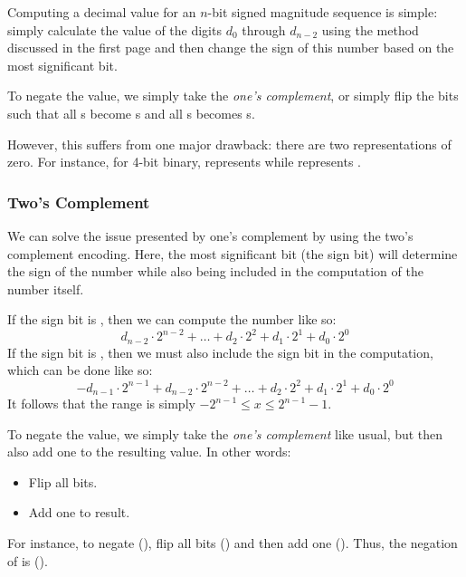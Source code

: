 \documentclass[letterpaper]{article}
\begin{document}
\bigskip 

Computing a decimal value for an $n$-bit signed magnitude sequence is simple: simply calculate the value of the digits $d_0$ through $d_{n - 2}$ using the method discussed in the first page and then change the sign of this number based on the most significant bit. 

\bigskip 

To negate the value, we simply take the \emph{one's complement}, or simply flip the bits such that all s become s and all s becomes s. 

\bigskip 

However, this suffers from one major drawback: there are two representations of zero. For instance, for 4-bit binary,  represents  while  represents . 

\subsubsection{Two's Complement}
We can solve the issue presented by one's complement by using the two's complement encoding. Here, the most significant bit (the sign bit) will determine the sign of the number while also being included in the computation of the number itself. 

\bigskip 

If the sign bit is , then we can compute the number like so:
\[d_{n - 2} \cdot 2^{n - 2} + \dots + d_2 \cdot 2^2 + d_1 \cdot 2^1 + d_0 \cdot 2^0\]
If the sign bit is , then we must also include the sign bit in the computation, which can be done like so:
\[- d_{n - 1} \cdot 2^{n - 1} + d_{n - 2} \cdot 2^{n - 2} + \dots + d_2 \cdot 2^2 + d_1 \cdot 2^1 + d_0 \cdot 2^0\]
It follows that the range is simply $-2^{n - 1} \leq x \leq 2^{n - 1} - 1$. 

\bigskip 

To negate the value, we simply take the \emph{one's complement} like usual, but then also add one to the resulting value. In other words:
\begin{itemize}
    \item Flip all bits. 
    \item Add one to result.
\end{itemize}

For instance, to negate  (), flip all bits () and then add one (). Thus, the negation of  is  ().
\end{document}
